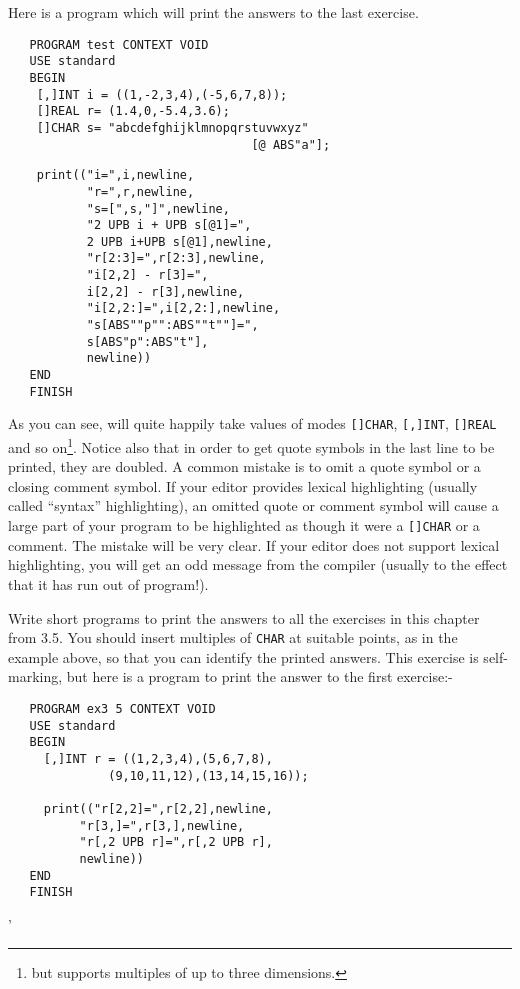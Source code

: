 Here is a program which will print the answers to the last exercise.
\begin{verbatim}
   PROGRAM test CONTEXT VOID
   USE standard
   BEGIN
    [,]INT i = ((1,-2,3,4),(-5,6,7,8));
    []REAL r= (1.4,0,-5.4,3.6);
    []CHAR s= "abcdefghijklmnopqrstuvwxyz"
                                  [@ ABS"a"];
\end{verbatim}
\begin{verbatim}
    print(("i=",i,newline,
           "r=",r,newline,
           "s=[",s,"]",newline,
           "2 UPB i + UPB s[@1]=",
           2 UPB i+UPB s[@1],newline,
           "r[2:3]=",r[2:3],newline,
           "i[2,2] - r[3]=",
           i[2,2] - r[3],newline,
           "i[2,2:]=",i[2,2:],newline,
           "s[ABS""p"":ABS""t""]=",
           s[ABS"p":ABS"t"],
           newline))
   END
   FINISH
\end{verbatim}
\noindent
As you can see,  will quite happily take values of modes
\verb|[]CHAR|, \verb|[,]INT|, \verb|[]REAL| and so on\footnote{but
\protect{} supports multiples of
up to three dimensions.}.  Notice also that in order to get quote
symbols in the last line to be printed, they are doubled.  A common
mistake is to omit a quote symbol or a closing comment symbol. If
your editor provides lexical highlighting (usually called ``syntax''
highlighting), an omitted quote or comment symbol will cause a large
part of your program to be highlighted as though it were a
\verb|[]CHAR| or a comment. The mistake will be very clear. If your
editor does not support lexical highlighting, you will get an odd
message from the compiler (usually to the effect that it has run out
of program!).

\begin{exercise}
\item Write short programs to print the answers to all the exercises
in this chapter from 3.5. You should insert multiples of
\verb|CHAR| at suitable points, as in the example above, so that you
can identify the printed answers. \ans This exercise is self-marking,
but here is a program to print the answer to the first exercise:-
\begin{verbatim}
   PROGRAM ex3 5 CONTEXT VOID
   USE standard
   BEGIN
     [,]INT r = ((1,2,3,4),(5,6,7,8),
              (9,10,11,12),(13,14,15,16));

     print(("r[2,2]=",r[2,2],newline,
          "r[3,]=",r[3,],newline,
          "r[,2 UPB r]=",r[,2 UPB r],
          newline))
   END
   FINISH
\end{verbatim}
'
\end{exercise}

